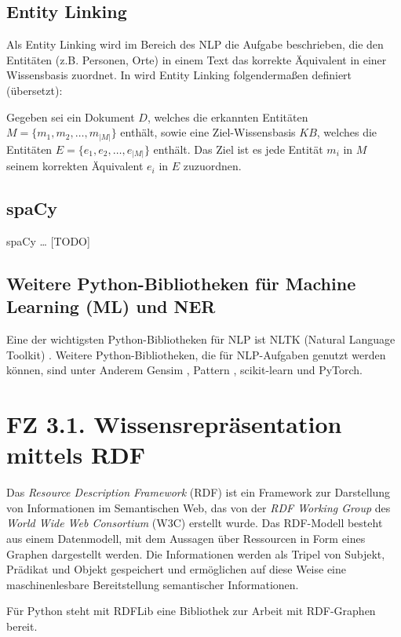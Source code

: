 \subsection{Entity Linking}
Als Entity Linking wird im Bereich des NLP die Aufgabe beschrieben, die den Entitäten (z.B. Personen, Orte) 
in einem Text das korrekte Äquivalent in einer Wissensbasis zuordnet.
In \cite{shen_entity_2021} wird Entity Linking folgendermaßen definiert (übersetzt):
\begin{defn}
Gegeben sei ein Dokument $D$, welches die erkannten Entitäten $M=\{m_1, m_2, \dots, m_{|M|}\}$ enthält, sowie
eine Ziel-Wissensbasis $KB$, welches die Entitäten $E=\{e_1, e_2, \dots, e_{|M|}\}$ enthält. Das Ziel ist es 
jede Entität $m_i$ in $M$ seinem korrekten Äquivalent $e_i$ in $E$ zuzuordnen.
\end{defn}

\subsection{spaCy}
spaCy \dots{} [TODO]

\subsection{Weitere Python-Bibliotheken für Machine Learning (ML) und NER}
Eine der wichtigsten Python-Bibliotheken für NLP ist NLTK (Natural Language Toolkit) \cite{bird2006nltk}.
Weitere Python-Bibliotheken, die für NLP-Aufgaben genutzt werden können, sind unter Anderem
Gensim \cite{vrehuuvrek2011gensim}, Pattern \cite{de2012pattern}\cite{github_pattern}, 
scikit-learn und PyTorch.

%
%
\section{FZ 3.1. Wissensrepräsentation mittels RDF}
\label{sec:fz3.1.} 

Das \emph{Resource Description Framework} (RDF) \citep{w3c_all_2022} ist ein Framework zur Darstellung von Informationen im Semantischen Web, das von der \emph{RDF Working Group} des  \emph{World Wide Web Consortium} (W3C) erstellt wurde. Das RDF-Modell besteht aus einem Datenmodell, mit dem Aussagen über Ressourcen in Form eines Graphen dargestellt werden. Die Informationen werden als Tripel von Subjekt, Prädikat und Objekt gespeichert und ermöglichen auf diese Weise eine maschinenlesbare Bereitstellung semantischer Informationen.


Für Python steht mit RDFLib \cite{rdflib_team_rdflib_2022} eine Bibliothek zur Arbeit mit RDF-Graphen bereit.

